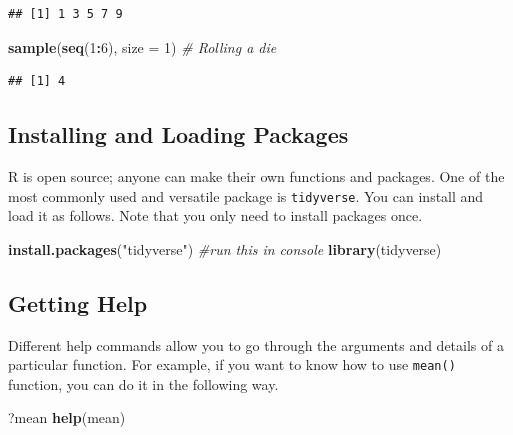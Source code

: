 \documentclass[
]{article}
\newenvironment{Shaded}{\begin{snugshade}}{\end{snugshade}}
\newcommand{\AttributeTok}[1]{\textcolor[rgb]{0.13,0.29,0.53}{#1}}
\newcommand{\CommentTok}[1]{\textcolor[rgb]{0.56,0.35,0.01}{\textit{#1}}}
\newcommand{\DecValTok}[1]{\textcolor[rgb]{0.00,0.00,0.81}{#1}}
\newcommand{\FunctionTok}[1]{\textcolor[rgb]{0.13,0.29,0.53}{\textbf{#1}}}
\newcommand{\NormalTok}[1]{#1}
\newcommand{\SpecialCharTok}[1]{\textcolor[rgb]{0.81,0.36,0.00}{\textbf{#1}}}
\newcommand{\StringTok}[1]{\textcolor[rgb]{0.31,0.60,0.02}{#1}}
\begin{document}
\begin{verbatim}
## [1] 1 3 5 7 9
\end{verbatim}

\begin{Shaded}
\begin{Highlighting}[]
\FunctionTok{sample}\NormalTok{(}\FunctionTok{seq}\NormalTok{(}\DecValTok{1}\SpecialCharTok{:}\DecValTok{6}\NormalTok{), }\AttributeTok{size =} \DecValTok{1}\NormalTok{) }\CommentTok{\# Rolling a die}
\end{Highlighting}
\end{Shaded}

\begin{verbatim}
## [1] 4
\end{verbatim}

\subsection{Installing and Loading
Packages}\label{installing-and-loading-packages}

R is open source; anyone can make their own functions and packages. One
of the most commonly used and versatile package is \texttt{tidyverse}.
You can install and load it as follows. Note that you only need to
install packages once.

\begin{Shaded}
\begin{Highlighting}[]
\FunctionTok{install.packages}\NormalTok{(}\StringTok{"tidyverse"}\NormalTok{) }\CommentTok{\#run this in console}
\FunctionTok{library}\NormalTok{(tidyverse) }
\end{Highlighting}
\end{Shaded}

\subsection{Getting Help}\label{getting-help}

Different help commands allow you to go through the arguments and
details of a particular function. For example, if you want to know how
to use \texttt{mean()} function, you can do it in the following way.

\begin{Shaded}
\begin{Highlighting}[]
\NormalTok{?mean}
\FunctionTok{help}\NormalTok{(mean)}
\end{Highlighting}
\end{Shaded}
\end{document}
